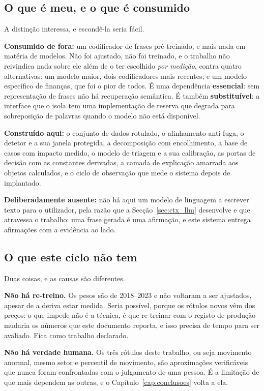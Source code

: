 \subsection{O que é meu, e o que é consumido}

A distinção interessa, e escondê-la seria fácil.

\textbf{Consumido de fora:} um codificador de frases pré-treinado, e mais nada em matéria de
modelos. Não foi ajustado, não foi treinado, e o trabalho não reivindica nada sobre ele além de o
ter escolhido \emph{por medição}, contra quatro alternativas: um modelo maior, dois codificadores
mais recentes, e um modelo específico de finanças, que foi o pior de todos. É uma dependência \textbf{essencial}: sem representação de frases não há
recuperação semântica. É também \textbf{substituível}: a interface que o isola tem uma
implementação de reserva que degrada para sobreposição de palavras quando o modelo não está
disponível.

\textbf{Construído aqui:} o conjunto de dados rotulado, o alinhamento anti-fuga, o detetor e a sua
janela protegida, a decomposição com encolhimento, a base de casos com impacto medido, o modelo de
triagem e a sua calibração, as portas de decisão com as constantes derivadas, a camada de explicação
amarrada aos objetos calculados, e o ciclo de observação que mede o sistema depois de implantado.

\textbf{Deliberadamente ausente:} não há aqui um modelo de linguagem a escrever texto para o
utilizador, pela razão que a Secção~\ref{sec:ctx_llm} desenvolve e que atravessa o trabalho: uma
frase gerada é uma afirmação, e este sistema entrega afirmações com a evidência ao lado.

\subsection{O que este ciclo não tem}

Duas coisas, e as causas são diferentes.

\textbf{Não há re-treino.} Os pesos são de 2018--2023 e não voltaram a ser ajustados, apesar de a
deriva estar medida. Seria possível, porque os rótulos novos vêm dos preços: o que impede não é a
técnica, é que re-treinar com o registo de produção mudaria os números que este documento reporta,
e isso precisa de tempo para ser avaliado. Fica como trabalho declarado.

\textbf{Não há verdade humana.} Os três rótulos deste trabalho, ou seja movimento anormal, mesmo
setor e percentil de movimento, são aproximações verificáveis que nunca foram confrontadas com o
julgamento de uma pessoa. É a limitação de que mais dependem as outras, e o
Capítulo~\ref{cap:conclusoes} volta a ela.
